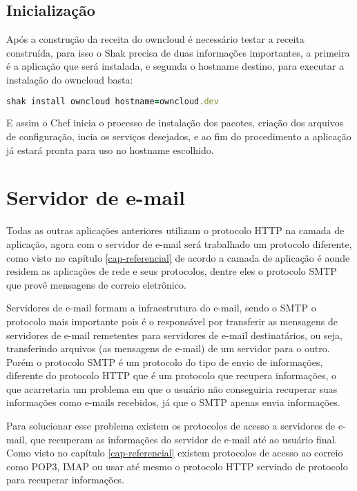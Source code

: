 \subsection{Inicialização}

Após a construção da receita do owncloud é necessário testar a receita construída,
para isso o Shak precisa de duas informações importantes, a primeira é a aplicação
que será instalada, e segunda o hostname destino, para executar a instalação
do owncloud basta:

\begin{lstlisting}[language=Ruby,label=dice_index,caption={Exemplo de execução de instalação do owncloud com shak}]
shak install owncloud hostname=owncloud.dev
\end{lstlisting}

E assim o Chef inicia o processo de instalação dos pacotes, criação dos arquivos
de configuração, incia os serviços desejados, e ao fim do procedimento a aplicação
já estará pronta para uso no hostname escolhido.


\section{Servidor de e-mail}
\label{sub:e-mail}

Todas as outras aplicações anteriores utilizam o protocolo
HTTP na camada de aplicação, agora com o servidor de e-mail será trabalhado um
protocolo diferente, como visto no capítulo \ref{cap-referencial}
de acordo \cite{kurose2010redes} a camada de aplicação é aonde residem as aplicações
de rede e seus protocolos, dentre eles o protocolo SMTP que provê mensagens de correio
eletrônico.

Servidores de e-mail formam a infraestrutura do e-mail, sendo o SMTP o protocolo
mais importante pois é o responsável por transferir as mensagens de servidores
de e-mail remetentes para servidores de e-mail destinatários, ou seja, transferindo
arquivos (as mensagens de e-mail) de um servidor para o outro. Porém o protocolo
SMTP é um protocolo do tipo de envio de informações, diferente do protocolo HTTP
que é um protocolo que recupera informações, o que acarretaria um problema em que
o usuário não conseguiria recuperar suas informações como e-mails recebidos, já
que o SMTP apenas envia informações.

Para solucionar esse problema existem os protocolos de acesso a servidores de
e-mail, que recuperam as informações do servidor de e-mail até ao usuário final.
Como visto no capítulo \ref{cap-referencial} existem protocolos de acesso ao correio
como POP3, IMAP ou usar até mesmo o protocolo HTTP servindo de protocolo para recuperar
informações.

